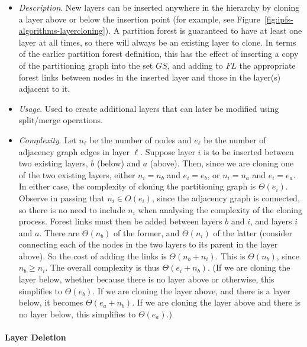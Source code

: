 \begin{itemize}

\item \emph{Description}. New layers can be inserted anywhere in the hierarchy by cloning a layer above or below the insertion point (for example, see Figure~\ref{fig:ipfs-algorithms-layercloning}). A partition forest is guaranteed to have at least one layer at all times, so there will always be an existing layer to clone. In terms of the earlier partition forest definition, this has the effect of inserting a copy of the partitioning graph into the set $\textit{GS}$, and adding to $\textit{FL}$ the appropriate forest links between nodes in the inserted layer and those in the layer(s) adjacent to it.

\item \emph{Usage}. Used to create additional layers that can later be modified using split/merge operations.

\item \emph{Complexity}. Let $n_\ell$ be the number of nodes and $e_\ell$ be the number of adjacency graph edges in layer $\ell$. Suppose layer $i$ is to be inserted between two existing layers, $b$ (below) and $a$ (above). Then, since we are cloning one of the two existing layers, either $n_i = n_b$ and $e_i = e_b$, or $n_i = n_a$ and $e_i = e_a$. In either case, the complexity of cloning the partitioning graph is $\Theta(e_i)$. Observe in passing that $n_i \in O(e_i)$, since the adjacency graph is connected, so there is no need to include $n_i$ when analysing the complexity of the cloning process. Forest links must then be added between layers $b$ and $i$, and layers $i$ and $a$. There are $\Theta(n_b)$ of the former, and $\Theta(n_i)$ of the latter (consider connecting each of the nodes in the two layers to its parent in the layer above). So the cost of adding the links is $\Theta(n_b + n_i)$. This is $\Theta(n_b)$, since $n_b \ge n_i$. The overall complexity is thus $\Theta(e_i + n_b)$. (If we are cloning the layer below, whether because there is no layer above or otherwise, this simplifies to $\Theta(e_b)$. If we are cloning the layer above, and there is a layer below, it becomes $\Theta(e_a + n_b)$. If we are cloning the layer above and there is no layer below, this simplifies to $\Theta(e_a)$.)

\end{itemize}


\paragraph{Layer Deletion}

